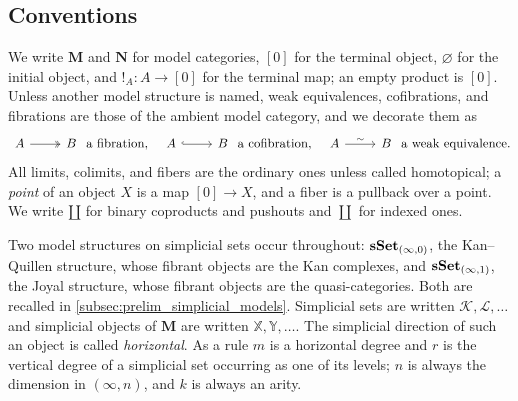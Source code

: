 \documentclass[10pt,reqno]{amsart}
\begin{document}
\subsection{Conventions}
\label{subsec:global_conventions}

We write $\mathbf M$ and $\mathbf N$ for model categories,
$[0]$ for the terminal object, $\varnothing$ for the initial
object, and $!_A:A\to[0]$ for the terminal map; an empty product is
$[0]$. Unless another model structure is named, weak equivalences,
cofibrations, and fibrations are those of the ambient model category,
and we decorate them as
\[
\begin{tikzcd}[ampersand replacement=\&]
A\arrow[r,two heads]\&B
\end{tikzcd}
\ \text{a fibration,}
\quad
\begin{tikzcd}[ampersand replacement=\&]
A\arrow[r,hook]\&B
\end{tikzcd}
\ \text{a cofibration,}
\quad
\begin{tikzcd}[ampersand replacement=\&]
A\arrow[r,"\sim"]\&B
\end{tikzcd}
\ \text{a weak equivalence.}
\]
All limits, colimits, and fibers are the ordinary ones unless called
homotopical; a \emph{point} of an object $X$ is a map $[0]\to X$, and a fiber is a pullback over a point. We write
$\amalg$ for binary coproducts and pushouts and $\coprod$ for
indexed ones.

Two model structures on simplicial sets occur throughout:
$\mathbf{sSet}_{(\infty,0)}$, the Kan--Quillen structure, whose fibrant
objects are the Kan complexes, and $\mathbf{sSet}_{(\infty,1)}$, the Joyal
structure, whose fibrant objects are the quasi-categories. Both are
recalled in \cref{subsec:prelim_simplicial_models}.
Simplicial sets are written $\mathcal K,\mathcal L,\ldots$ and
simplicial objects of $\mathbf M$ are written
$\mathbb X,\mathbb Y,\ldots$. The simplicial direction of such an
object is called \emph{horizontal}. As a rule $m$ is a horizontal
degree and $r$ is the vertical degree of a simplicial set occurring
as one of its levels; $n$ is always the dimension in
$(\infty,n)$, and $k$ is always an arity.
\end{document}
